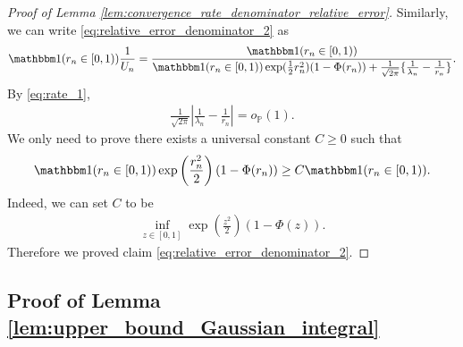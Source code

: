 \documentclass[12pt]{article}
\theoremstyle{definition}
\def\P{\mathbb{P}}
\def\P{\mathbb{P}}
\renewcommand{\P}{\mathbb{P}}							%
\newcommand{\indicator}{\mathbbm 1}						%
\begin{document}
\begin{proof}[Proof of Lemma \ref{lem:convergence_rate_denominator_relative_error}]
	Similarly, we can write \eqref{eq:relative_error_denominator_2} as 
	\begin{align*}
		\indicator(r_n\in [0,1))\frac{1}{U_n}=\frac{\indicator(r_n\in [0,1))}{\indicator(r_n\in [0,1))\exp(\frac{1}{2}r_n^2)(1-\Phi(r_n))+\frac{1}{\sqrt{2\pi}}\{\frac{1}{\lambda_n}-\frac{1}{r_n}\}}.
	\end{align*}
	By \eqref{eq:rate_1},
	\begin{align*}
		\frac{1}{\sqrt{2\pi}}\left|\frac{1}{\lambda_n}-\frac{1}{r_n}\right|=o_{\P}(1).
	\end{align*}
	We only need to prove there exists a universal constant $C\geq 0$ such that
	\begin{align*}
		\indicator(r_n\in [0,1))\exp\left(\frac{r_n^2}{2}\right)(1-\Phi(r_n))\geq C\indicator(r_n\in [0,1)).
	\end{align*}
	Indeed, we can set $C$ to be 
	\begin{align*}
		\inf_{z\in [0,1]}\exp\left(\frac{z^2}{2}\right)(1-\Phi(z)).
	\end{align*}
	Therefore we proved claim \eqref{eq:relative_error_denominator_2}.	
\end{proof}

	\subsection{Proof of Lemma \ref{lem:upper_bound_Gaussian_integral}}
\end{document}
